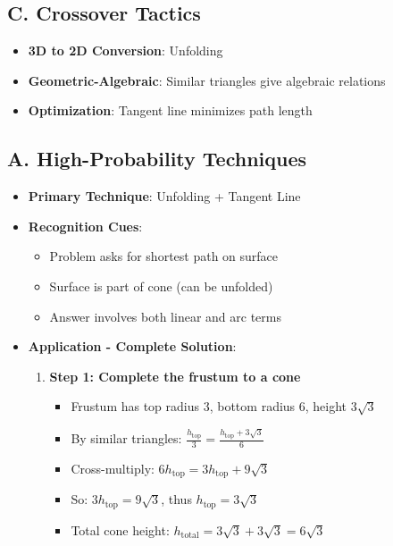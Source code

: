 \documentclass[12pt]{article}
\begin{document}
\begin{tacticalbox}
\subsection*{C. Crossover Tactics}
\begin{itemize}[leftmargin=*]
    \item \textbf{3D to 2D Conversion}: Unfolding
    \item \textbf{Geometric-Algebraic}: Similar triangles give algebraic relations
    \item \textbf{Optimization}: Tangent line minimizes path length
\end{itemize}
\end{tacticalbox}

\begin{techniquesbox}
\subsection*{A. High-Probability Techniques}
\begin{itemize}[leftmargin=*]
    \item \textbf{Primary Technique}: Unfolding + Tangent Line
    \item \textbf{Recognition Cues}: 
    \begin{itemize}
        \item Problem asks for shortest path on surface
        \item Surface is part of cone (can be unfolded)
        \item Answer involves both linear and arc terms
    \end{itemize}
    \item \textbf{Application - Complete Solution}: 
    \begin{enumerate}
        \item \textbf{Step 1: Complete the frustum to a cone}
        \begin{itemize}
            \item Frustum has top radius 3, bottom radius 6, height $3\sqrt{3}$
            \item By similar triangles: $\frac{h_{\text{top}}}{3} = \frac{h_{\text{top}} + 3\sqrt{3}}{6}$
            \item Cross-multiply: $6h_{\text{top}} = 3h_{\text{top}} + 9\sqrt{3}$
            \item So: $3h_{\text{top}} = 9\sqrt{3}$, thus $h_{\text{top}} = 3\sqrt{3}$
            \item Total cone height: $h_{\text{total}} = 3\sqrt{3} + 3\sqrt{3} = 6\sqrt{3}$
        \end{itemize}
        

\end{enumerate}
\end{itemize}
\end{techniquesbox}
\end{document}
